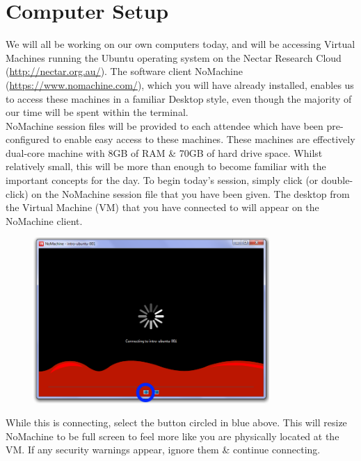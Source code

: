 \documentclass[a4paper,12pt,twoside]{memoir}
\begin{document}
\section{Computer Setup}
\begin{information}
We will all be working on our own computers today, and will be accessing Virtual Machines running the Ubuntu operating system on the Nectar Research Cloud (\url{http://nectar.org.au/}).
The software client NoMachine (\url{https://www.nomachine.com/}), which you will have already installed, enables us to access these machines in a familiar Desktop style, even though the majority of our time will be spent within the terminal. \\

NoMachine session files will be provided to each attendee which have been pre-configured to enable easy access to these machines.
These machines are effectively dual-core machine with 8GB of RAM \& 70GB of hard drive space.
Whilst relatively small, this will be more than enough to become
familiar with the important concepts for the day.
To begin today's session, simply click (or double-click) on the
NoMachine session file that you have been given.
The desktop from the Virtual Machine (VM) that you have connected to will appear on the
NoMachine client. \\
\end{information}

\begin{figure}[h!]
  \centering
    \includegraphics[width=0.8\textwidth]{NoMachine}
\end{figure}

While this is connecting, select the button circled in blue above.
This will resize NoMachine to be full screen to feel more like you are physically located at the VM.
If any security warnings appear, ignore them \& continue connecting.
\end{document}
